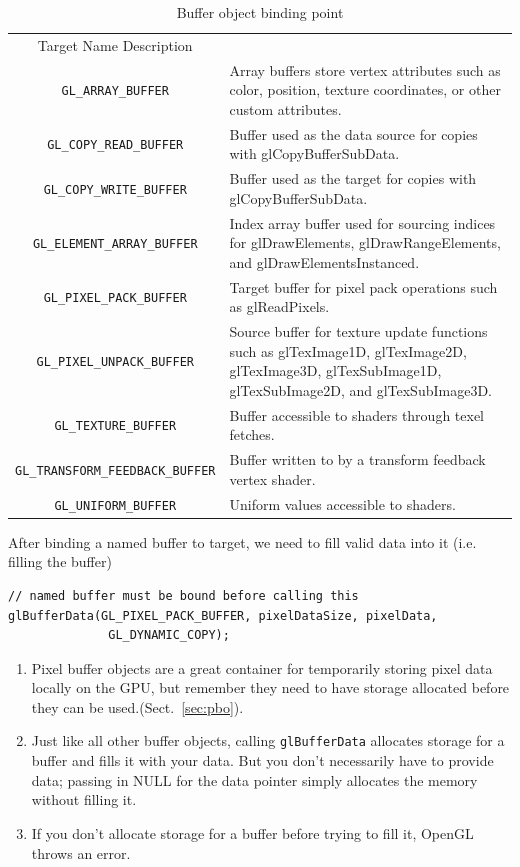 \begin{table}[hbt]
\begin{center}
\caption{Buffer object binding point}
\begin{tabular}{cp{7cm}} 
\hline
Target Name Description \\

\verb!GL_ARRAY_BUFFER! & Array buffers store vertex attributes such as color, position, texture
coordinates, or other custom attributes. \\
\verb!GL_COPY_READ_BUFFER! & Buffer used as the data source for copies with
glCopyBufferSubData. \\
\verb!GL_COPY_WRITE_BUFFER! & Buffer used as the target for copies
with glCopyBufferSubData. \\
\verb!GL_ELEMENT_ARRAY_BUFFER! & Index array buffer used for sourcing indices for glDrawElements,
glDrawRangeElements, and glDrawElementsInstanced. \\
\verb!GL_PIXEL_PACK_BUFFER! & Target buffer for pixel pack operations
such as glReadPixels. \\
\verb!GL_PIXEL_UNPACK_BUFFER! & Source buffer for texture update functions such as glTexImage1D,
glTexImage2D, glTexImage3D, glTexSubImage1D,
glTexSubImage2D, and glTexSubImage3D. \\
\verb!GL_TEXTURE_BUFFER! & Buffer accessible to shaders through texel
fetches. \\
\verb!GL_TRANSFORM_FEEDBACK_BUFFER! & Buffer written to by a transform
feedback vertex shader. \\
\verb!GL_UNIFORM_BUFFER! & Uniform values accessible to shaders. \\
\hline\hline
\end{tabular}
\end{center}
\label{tab:binding_point}
\end{table}


After binding a named buffer to target, we need to fill valid data
into it (i.e. filling the buffer)
\begin{verbatim}
// named buffer must be bound before calling this
glBufferData(GL_PIXEL_PACK_BUFFER, pixelDataSize, pixelData,
              GL_DYNAMIC_COPY);

\end{verbatim}

\begin{enumerate}
\item Pixel buffer objects are a great container for temporarily
  storing pixel data locally on the GPU, but remember they need to
  have storage allocated before they can be
  used.(Sect.~\ref{sec:pbo}). 

\item Just like all other buffer objects, calling \verb!glBufferData!
  allocates storage for a buffer and fills it with your data. But you
  don't necessarily have to provide data; passing in NULL for the data
  pointer simply allocates the memory without filling it.

\item If you don't allocate storage for a buffer before trying to fill
  it, OpenGL throws an error.
\end{enumerate}

